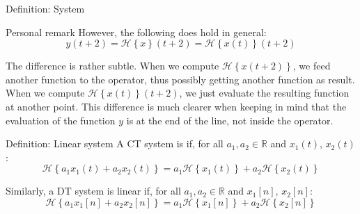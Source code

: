 \documentclass[a4paper]{article}
\begin{document}
\begin{parag}{Definition: System}
\begin{subparag}{Personal remark}
       However, the following does hold in general: 
       \[y\left(t+2\right) = \mathcal{H}\left\{x\right\}\left(t+2\right) = \mathcal{H}\left\{x\left(t\right)\right\}\left(t+2\right)\]
       
       The difference is rather subtle. When we compute $\mathcal{H}\left\{x\left(t+2\right)\right\}$, we feed another function to the operator, thus possibly getting another function as result. When we compute $\mathcal{H}\left\{x\left(t\right)\right\}\left(t+2\right)$, we just evaluate the resulting function at another point. This difference is much clearer when keeping in mind that the evaluation of the function $y$ is at the end of the line, not inside the operator.
    \end{subparag}
\end{parag}

\begin{parag}{Definition: Linear system}
    A CT system is  if, for all $a_1, a_2 \in \mathbb{R}$ and $x_1\left(t\right)$, $x_2\left(t\right)$: 
    \[\mathcal{H}\left\{a_1 x_1\left(t\right) + a_2 x_2\left(t\right)\right\} = a_1 \mathcal{H}\left\{x_1\left(t\right)\right\} + a_2 \mathcal{H}\left\{x_2\left(t\right)\right\}\]
    
    Similarly, a DT system is linear if, for all $a_1, a_2 \in \mathbb{R}$ and $x_1\left[n\right]$, $x_2\left[n\right]$: 
    \[\mathcal{H}\left\{a_1 x_1\left[n\right] + a_2 x_2\left[n\right]\right\} = a_1 \mathcal{H}\left\{x_1\left[n\right]\right\} + a_2 \mathcal{H}\left\{x_2\left[n\right]\right\}\]
\end{parag}
\end{document}
